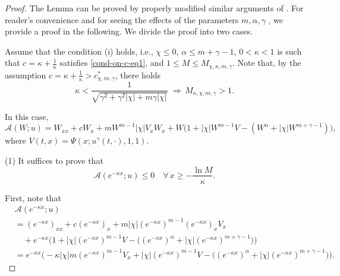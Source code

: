 \documentclass[11pt]{article} %
\theoremstyle{remark}
\theoremstyle{remark}
\numberwithin{equation}{section}
\numberwithin{figure}{section}
\numberwithin{table}{section}
\begin{document}
\begin{proof} The Lemma can be proved by properly modified similar arguments of \cite[Theorem 2.1(2)]{SaSh2020}.
For reader's convenience and for seeing the effects of the parameters $m,\alpha,\gamma$ , we provide a proof in the following.
We divide the proof into two cases.

\smallskip

 Assume that the condition (i) holds, i.e.,  $\chi\le 0$,  $\alpha\le m+\gamma -1$,   $0<\kappa <1$ is such that $c=\kappa+\frac{1}{\kappa}$ satisfies \eqref{cond-on-c-eq1},
and   $1\le M\le M_{\chi,\kappa,m,\gamma}$.  
Note that, by the assumption $c=\kappa+\frac{1}{\kappa}>c^*_{\chi,m,\gamma}$,  there holds 
\begin{equation}
\label{aux-M-eq1}
\kappa< \frac{1}{\sqrt {\gamma^2+\gamma^2|\chi|+m\gamma |\chi|}}\,\,\Longrightarrow \, M_{\kappa,\chi,m,\gamma}>1.
\end{equation}


\smallskip

In this case,
$$
\mathcal{A}(W;u)=W_{xx}+cW_x+m W^{m-1} |\chi| V_x W_x + W\big(1+|\chi|W^{m-1} V -(W^\alpha +|\chi| W^{m+\gamma-1})\big),
$$
where $V(t,x)=\Psi(x;u^\gamma (t,\cdot),1,1)$.

(1) 
It suffices to prove that
$$
\mathcal{A}(e^{-\kappa x};u)\le 0\quad \forall\,  x\ge -\frac{\ln M}{\kappa}.
$$

First, note that
\begin{align}
\label{super-solu-eq1}
&\mathcal{A}(e^{-\kappa x};u)\nonumber\\
&=  (e^{-\kappa x})_{xx}+c (e^{-\kappa x})_x + m |\chi|(e^{-\kappa x})^{m-1}  (e^{-\kappa x})_xV_x \nonumber\\
&\quad + e^{-\kappa x}\Big(
1+ |\chi| (e^{-\kappa x})^{m-1} V-\big(( e^{- \kappa x})^\alpha+|\chi| (e^{-\kappa x})^{m+\gamma-1}\big)\Big)\nonumber\\
&=e^{-\kappa x}\Big(-\kappa |\chi| m  (e^{-\kappa x})^{m-1} V_x + |\chi|(e^{-\kappa x})^{m-1} V -\big(( e^{- \kappa x})^\alpha+|\chi| (e^{-\kappa x})^{m+\gamma-1}\big)\Big).
\end{align}


\end{proof}
\end{document}
